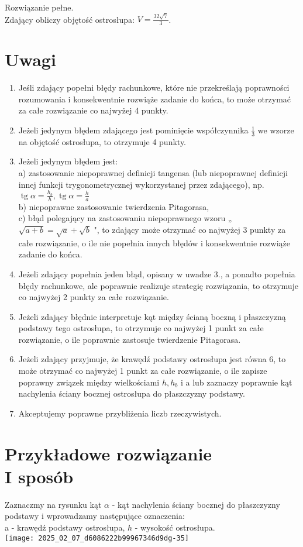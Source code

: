 \documentclass[10pt]{article}
\begin{document}
Rozwiązanie pełne.\\
Zdający obliczy objętość ostrosłupa: $V=\frac{32 \sqrt{7}}{3}$.

\section*{Uwagi}
\begin{enumerate}
  \item Jeśli zdający popełni błędy rachunkowe, które nie przekreślają poprawności rozumowania i konsekwentnie rozwiąże zadanie do końca, to może otrzymać za całe rozwiązanie co najwyżej 4 punkty.
  \item Jeżeli jedynym błędem zdającego jest pominięcie współczynnika $\frac{1}{3}$ we wzorze na objętość ostrosłupa, to otrzymuje 4 punkty.
  \item Jeżeli jedynym błędem jest:\\
a) zastosowanie niepoprawnej definicji tangensa (lub niepoprawnej definicji innej funkcji trygonometrycznej wykorzystanej przez zdającego), np. $\operatorname{tg} \alpha=\frac{h_{b}}{h}, \operatorname{tg} \alpha=\frac{h}{a}$\\
b) niepoprawne zastosowanie twierdzenia Pitagorasa,\\
c) błąd polegający na zastosowaniu niepoprawnego wzoru „ $\sqrt{a+b}=\sqrt{a}+\sqrt{b}$ ", to zdający może otrzymać co najwyżej 3 punkty za całe rozwiązanie, o ile nie popełnia innych błędów i konsekwentnie rozwiąże zadanie do końca.
  \item Jeżeli zdający popełnia jeden błąd, opisany w uwadze 3., a ponadto popełnia błędy rachunkowe, ale poprawnie realizuje strategię rozwiązania, to otrzymuje co najwyżej 2 punkty za całe rozwiązanie.
  \item Jeżeli zdający błędnie interpretuje kąt między ścianą boczną i płaszczyzną podstawy tego ostrosłupa, to otrzymuje co najwyżej 1 punkt za całe rozwiązanie, o ile poprawnie zastosuje twierdzenie Pitagorasa.
  \item Jeżeli zdający przyjmuje, że krawędź podstawy ostrosłupa jest równa 6, to może otrzymać co najwyżej 1 punkt za całe rozwiązanie, o ile zapisze poprawny związek między wielkościami $h, h_{b}$ i a lub zaznaczy poprawnie kąt nachylenia ściany bocznej ostrosłupa do płaszczyzny podstawy.
  \item Akceptujemy poprawne przybliżenia liczb rzeczywistych.
\end{enumerate}

\section*{Przykładowe rozwiązanie \\
 I sposób}
Zaznaczmy na rysunku kąt $\alpha$ - kąt nachylenia ściany bocznej do płaszczyzny podstawy i wprowadzamy następujące oznaczenia:\\
a - krawędź podstawy ostrosłupa, $h$ - wysokość ostrosłupa.\\
\texttt{[image: 2025\_02\_07\_d6086222b99967346d9dg-35]}
\end{document}
